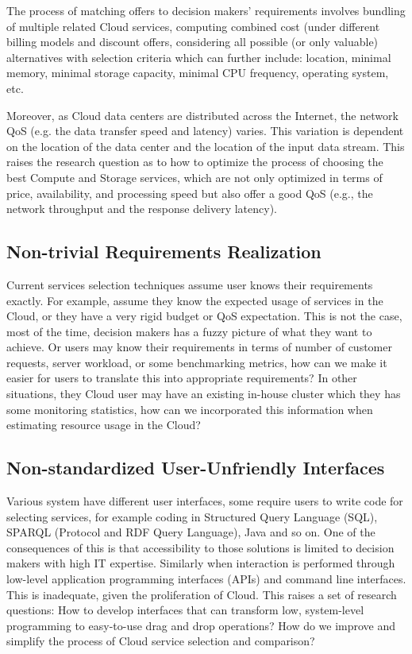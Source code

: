 The process of matching offers to decision makers’ requirements
involves bundling of multiple related Cloud services,
computing combined cost (under different billing models and
discount offers, considering all possible (or only valuable)
alternatives with selection criteria which can further include: location, minimal memory,
minimal storage capacity, minimal CPU frequency, operating system, etc.

Moreover, as Cloud data centers are distributed across the Internet,
the network QoS (e.g. the data transfer speed and latency) varies. This
variation is dependent on the location of the data center and the
location of the input data stream. This raises
the research question as to how to optimize the process of
choosing the best Compute and Storage services, which are not
only optimized in terms of price, availability, and processing
speed but also offer a good QoS (e.g., the network throughput
and the response delivery latency).

\subsection{Non-trivial Requirements Realization}
\label{subsec:Non-trivialRequirementsRealization}
Current services selection techniques assume user knows their requirements exactly.
For example, assume they know the expected usage of services in the Cloud,
or they have a very rigid budget or QoS expectation. This is not the case, most of the time,
decision makers has a fuzzy picture of what they want to achieve. 
Or users may know their requirements in terms of number of customer requests, server workload,
or some benchmarking metrics, how can we make it easier for users to translate this into appropriate
requirements?
In other situations, they Cloud user may have an existing in-house cluster which they has
some monitoring statistics, how can we incorporated this information when estimating resource usage in the Cloud?

\subsection{Non-standardized User-Unfriendly Interfaces}
\label{subsec:Non-standardizedUser-UnfriendlyInterfaces}
Various system have different user interfaces, some require users to write code for selecting services, for example coding in Structured Query Language (SQL), SPARQL (Protocol and RDF Query Language), Java and so on.
One of the consequences of this is that accessibility to those solutions is limited to decision makers with high IT expertise. 
Similarly when interaction is performed through low-level application programming interfaces (APIs) and command line interfaces. This is inadequate, given the proliferation of Cloud.
This raises a set of research questions: How to develop interfaces that can transform low, system-level programming to easy-to-use drag and drop operations? How do we improve and simplify the process of Cloud service selection and comparison?

